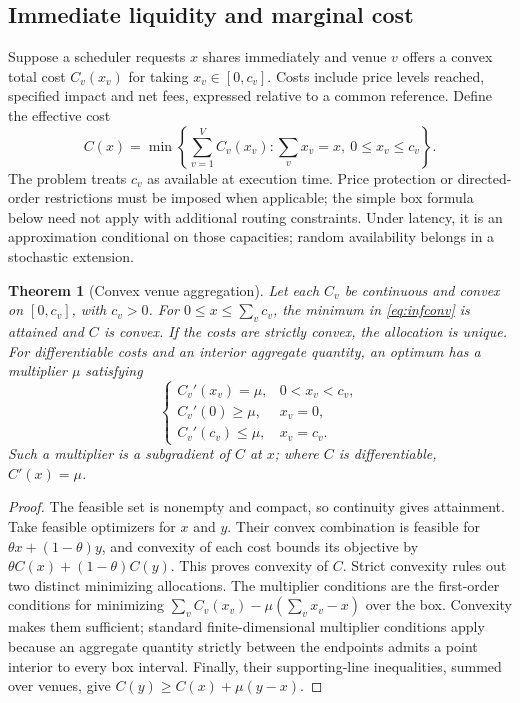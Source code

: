 \documentclass[11pt]{article}
\numberwithin{equation}{section}
\newtheorem{theorem}{Theorem}[section]
\theoremstyle{definition}
\theoremstyle{remark}
\theoremstyle{definition}
\begin{document}
\subsection{Immediate liquidity and marginal cost}

Suppose a scheduler requests $x$ shares immediately and venue $v$ offers a
convex total cost $C_v(x_v)$ for taking $x_v\in[0,c_v]$. Costs include price
levels reached, specified impact and net fees, expressed relative to a common
reference. Define the effective cost
\begin{equation}\label{eq:infconv}
 C(x)=\min\left\{\sum_{v=1}^V C_v(x_v):
                 \sum_vx_v=x,\ 0\leq x_v\leq c_v\right\}.
\end{equation}
The problem treats $c_v$ as available at execution time. Price protection or
directed-order restrictions must be imposed when applicable; the simple box
formula below need not apply with additional routing constraints. Under latency, it is
an approximation conditional on those capacities; random availability belongs
in a stochastic extension.

\begin{theorem}[Convex venue aggregation]\label{thm:routing}
Let each $C_v$ be continuous and convex on $[0,c_v]$, with $c_v>0$.
For $0\leq x\leq\sum_vc_v$, the minimum in \eqref{eq:infconv} is attained and
$C$ is convex. If the costs are strictly convex, the allocation is unique.
For differentiable costs and an interior aggregate quantity, an optimum has
a multiplier $\mu$ satisfying
\begin{equation}\label{eq:kkt}
 \begin{cases}
 C_v'(x_v)=\mu,&0<x_v<c_v,\\
 C_v'(0)\geq\mu,&x_v=0,\\
 C_v'(c_v)\leq\mu,&x_v=c_v.
 \end{cases}
\end{equation}
Such a multiplier is a subgradient of $C$ at $x$; where $C$ is differentiable,
$C'(x)=\mu$.
\end{theorem}
\begin{proof}
The feasible set is nonempty and compact, so continuity gives attainment.
Take feasible optimizers for $x$ and $y$. Their convex combination is feasible
for $\theta x+(1-\theta)y$, and convexity of each cost bounds its objective
by $\theta C(x)+(1-\theta)C(y)$. This proves convexity of $C$. Strict convexity
rules out two distinct minimizing allocations. The multiplier conditions are
the first-order conditions for minimizing
$\sum_vC_v(x_v)-\mu(\sum_vx_v-x)$ over the box. Convexity makes them
sufficient; standard finite-dimensional multiplier conditions apply because
an aggregate quantity strictly between the endpoints admits a point interior
to every box interval. Finally, their supporting-line inequalities, summed
over venues, give $C(y)\geq C(x)+\mu(y-x)$.
\end{proof}
\end{document}
